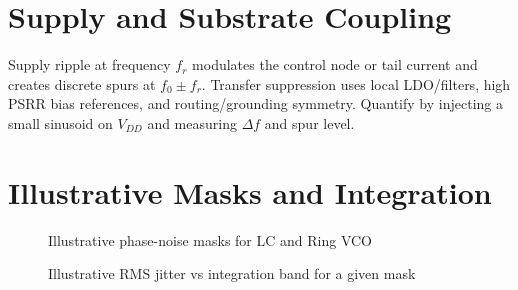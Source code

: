 \section{Supply and Substrate Coupling}
Supply ripple at frequency \(f_r\) modulates the control node or tail current and creates discrete spurs at \(f_0\pm f_r\). Transfer suppression uses local LDO/filters, high PSRR bias references, and routing/grounding symmetry. Quantify by injecting a small sinusoid on \(V_{DD}\) and measuring \(\Delta f\) and spur level.

\section{Illustrative Masks and Integration}
\begin{figure}[H]
  \centering
  \caption{Illustrative phase-noise masks for LC and Ring VCO}
\end{figure}

\begin{figure}[H]
  \centering
  \caption{Illustrative RMS jitter vs integration band for a given mask}
\end{figure}


